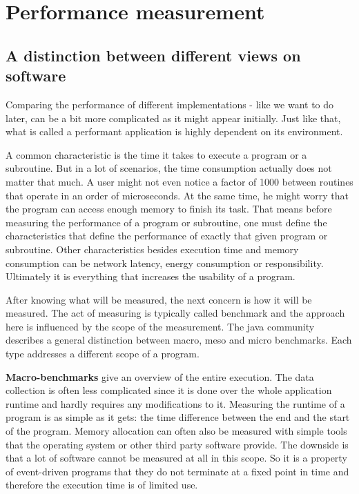 \section{Performance measurement}
\label{benchmarking}
\subsection{A distinction between different views on software}
Comparing the performance of different implementations - like we want to do later, can be a bit more complicated as it might appear initially. Just like that, what is called a performant application is highly dependent on its environment. 

A common characteristic is the time it takes to execute a program or a subroutine. But in a lot of scenarios, the time consumption actually does not matter that much. A user might not even notice a factor of 1000 between routines that operate in an order of microseconds. At the same time, he might worry that the program can access enough memory to finish its task. That means before measuring the performance of a program or subroutine, one must define the characteristics that define the performance of exactly that given program or subroutine. Other characteristics besides execution time and memory consumption can be network latency, energy consumption or responsibility. Ultimately it is everything that increases the usability of a program.

After knowing what will be measured, the next concern is how it will be measured. The act of measuring is typically called benchmark and the approach here is influenced by the scope of the measurement. The java community describes a general distinction between macro, meso and micro benchmarks\cite{oaks2014java}. Each type addresses a different scope of a program.

\textbf{Macro-benchmarks} give an overview of the entire execution. The data collection is often less complicated since it is done over the whole application runtime and hardly requires any modifications to it. Measuring the runtime of a program is as simple as it gets: the time difference between the end and the start of the program. Memory allocation can often also be measured with simple tools that the operating system or other third party software provide. The downside is that a lot of software cannot be measured at all in this scope. So it is a property of event-driven programs that they do not terminate at a fixed point in time and therefore the execution time is of limited use.

